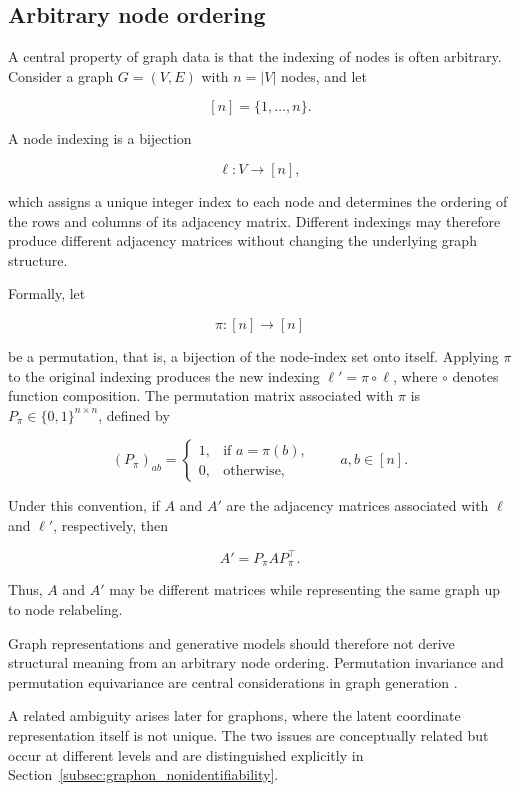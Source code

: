 \subsection{Arbitrary node ordering}
\label{subsec:arbitrary_node_ordering}

A central property of graph data is that the indexing of nodes is often arbitrary. Consider a graph \(G=(V,E)\) with \(n=|V|\) nodes, and let

\[
[n]=\{1,\ldots,n\}.
\]

A node indexing is a bijection

\[
\ell:V\to[n],
\]

which assigns a unique integer index to each node and determines the ordering of the rows and columns of its adjacency matrix. Different indexings may therefore produce different adjacency matrices without changing the underlying graph structure.

Formally, let

\[
\pi:[n]\to[n]
\]

be a permutation, that is, a bijection of the node-index set onto itself. Applying \(\pi\) to the original indexing produces the new indexing
\(\ell'=\pi\circ\ell\), where \(\circ\) denotes function composition. The permutation matrix associated with \(\pi\) is
\(P_\pi\in\{0,1\}^{n\times n}\), defined by

\[
(P_\pi)_{ab}
=
\begin{cases}
1, & \text{if } a=\pi(b),\\
0, & \text{otherwise},
\end{cases}
\qquad a,b\in[n].
\]

Under this convention, if \(A\) and \(A'\) are the adjacency matrices associated with \(\ell\) and \(\ell'\), respectively, then

\[
A'=P_\pi A P_\pi^\top.
\]

Thus, \(A\) and \(A'\) may be different matrices while representing the same graph up to node relabeling.

Graph representations and generative models should therefore not derive structural meaning from an arbitrary node ordering. Permutation invariance and permutation equivariance are central considerations in graph generation \cite{niu2020permutation}.

A related ambiguity arises later for graphons, where the latent coordinate representation itself is not unique. The two issues are conceptually related but occur at different levels and are distinguished explicitly in Section~\ref{subsec:graphon_nonidentifiability}.


